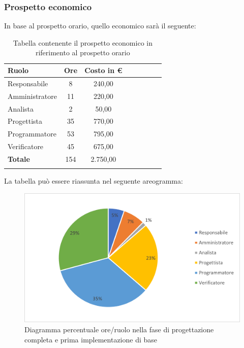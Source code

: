 			\subsubsection{Prospetto economico}
			In base al prospetto orario, quello economico sarà il seguente: 
			
			\begin{longtable}{|l|c|c|c|c|c|c|c|}
				\hline
				\rowcolor{lighter-grayer}
				\textbf{Ruolo} & \textbf{Ore} & \textbf{Costo in €} \\
				\hline
				\endfirsthead
				
				\hline
				Responsabile & 8 & 240,00\\
				\hline
				\hline
				Amministratore & 11 & 220,00\\
				\hline
				\hline
				Analista & 2 & 50,00\\
				\hline
				\hline
				Progettista & 35 & 770,00\\
				\hline
				\hline
				Programmatore & 53 & 795,00\\
				\hline
				\hline
				Verificatore & 45 & 675,00\\
				\hline
				\hline
				\textbf{Totale} & 154 & 2.750,00\\
				\hline
				\rowcolor{white}
				\caption{Tabella contenente il prospetto economico in riferimento al prospetto orario}
			\end{longtable}
			\pagebreak
		
			La tabella può essere riassunta nel seguente areogramma:
			\begin{figure}[H]
				\centering
				\includegraphics[width=0.8\linewidth]{res/images/preventivo/5-2.png}
				\caption{Diagramma percentuale ore/ruolo nella fase di progettazione completa e prima implementazione di base}
				\label{fig:diagramma costi ruolo fase progettazione completa e prima implementazione di base}
            \end{figure}

